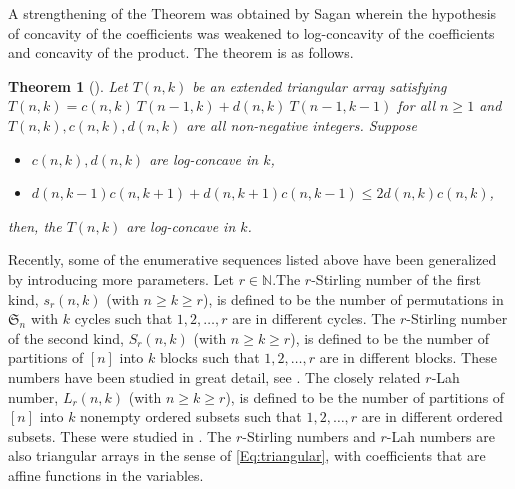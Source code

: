 \documentclass{article}
\newcommand{\SSS}{\mathfrak{S}}
\newcommand{\N}{\mathbb{N}}
\newtheorem{theorem}{Theorem}[section]
\theoremstyle{definition}
\numberwithin{equation}{section}
\begin{document}
A strengthening of the Theorem was obtained by Sagan \cite{sagan-log-concave} wherein the hypothesis of concavity of the coefficients was weakened to log-concavity of the coefficients and concavity of the product. The theorem is as follows.

\begin{theorem}[{\cite[Theorem 1]{sagan-log-concave}}]
    Let $T(n,k)$ be an extended triangular array satisfying $T(n,k)=c(n,k)\ T(n-1,k) + d(n,k)\ T(n-1,k-1)$ for all $n\ge 1$ and $T(n,k),c(n,k),d(n,k)$ are all non-negative integers. Suppose 
    \begin{itemize}
        \item $c(n,k),d(n,k)$ are log-concave in $k$,
        \item $d(n,k-1)c(n,k+1)+d(n,k+1)c(n,k-1)\le 2d(n,k)c(n,k)$,
    \end{itemize}
    then, the $T(n,k)$ are log-concave in $k$.
\end{theorem}

Recently, some of the enumerative sequences listed above have been generalized by introducing more parameters.
Let $r \in \N$.The $r$-Stirling number of the first kind, $s_r(n,k)$ (with $n\ge k\ge r$), is defined to be the number of permutations 
in $\SSS_n$ with $k$ cycles such that $1,2,\dotsc, r$ are in different cycles.
The $r$-Stirling number of the second kind, $S_r(n,k)$ (with $n\ge k\ge r$), is defined to be the number of partitions
 of $[n]$ into $k$ blocks such that $1,2,\dots,r$ are in different blocks. These numbers have been studied in great detail, see \cite{broder-r-stir, stirling-ref-2}.
The closely related $r$-Lah number, $L_r(n,k)$ (with $n\ge k\ge r$), is defined to be the number of partitions of 
$[n]$ into $k$ nonempty ordered subsets such that $1,2,\dots,r$ are in different ordered subsets.
These were studied in \cite{r-lah-ref-1,r-lah-ref-2,lah-ref-3}.
The $r$-Stirling numbers and $r$-Lah numbers are also triangular arrays in the sense of \eqref{Eq:triangular}, with 
coefficients that are affine functions in the variables.
\end{document}
